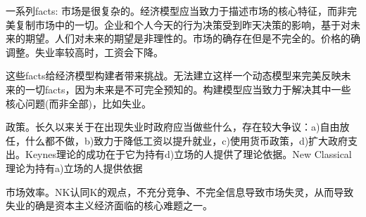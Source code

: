 一系列facts:
市场是很复杂的。经济模型应当致力于描述市场的核心特征，而非完美复制市场中的一切。企业和个人今天的行为决策受到昨天决策的影响，基于对未来的期望。人们对未来的期望是非理性的。市场的确存在但是不完全的。价格的确调整。失业率较高时，工资会下降。

这些facts给经济模型构建者带来挑战。无法建立这样一个动态模型来完美反映未来的一切facts，因为未来是不可完全预知的。构建模型应当致力于解决其中一些核心问题(而非全部)，比如失业。

政策。长久以来关于在出现失业时政府应当做些什么，存在较大争议：a)自由放任，什么都不做，b)致力于降低工资以提升就业，c)使用货币政策，d)扩大政府支出。Keynes理论的成功在于它为持有d)立场的人提供了理论依据。New Classical理论为持有a)立场的人提供依据

市场效率。NK认同K的观点，不充分竞争、不完全信息导致市场失灵，从而导致失业的确是资本主义经济面临的核心难题之一。

